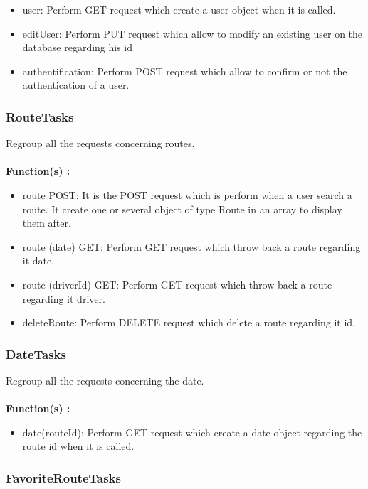 \begin{itemize}
\item user: Perform GET request which create a user object when it is called.
\item editUser: Perform PUT request which allow to modify an existing user on the database regarding his id
\item authentification: Perform POST request which allow to confirm or not the authentication of a user.
\end{itemize}

\subsubsection{RouteTasks}

Regroup all the requests concerning routes.
\\\\
\textbf{Function(s) :}

\begin{itemize}
\item route POST: It is the POST request which is perform when a user search a route. It create one or several object of type Route in an array to display them after.
\item route (date) GET: Perform GET request which throw back a route regarding it date.
\item route (driverId) GET: Perform GET request which throw back a route regarding it driver.
\item deleteRoute: Perform DELETE request which delete a route regarding it id.
\end{itemize}

\subsubsection{DateTasks}

Regroup all the requests concerning the date.
\\\\
\textbf{Function(s) :}

\begin{itemize}
\item date(routeId): Perform GET request which create a date object regarding the route id when it is called.
\end{itemize}

\subsubsection{FavoriteRouteTasks}

